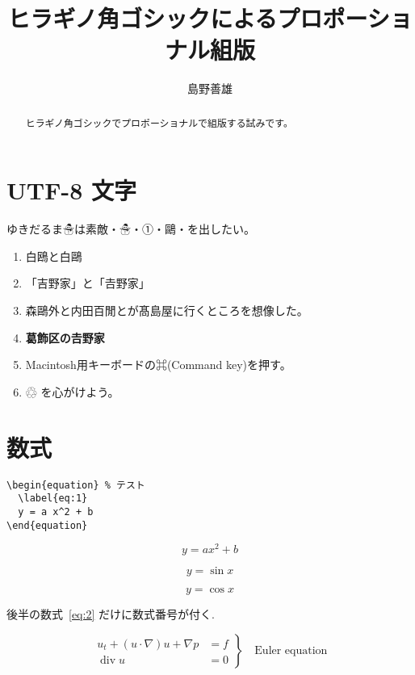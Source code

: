 \documentclass[14pt,a4paper]{ltjsarticle}
\title{ヒラギノ角ゴシックによるプロポーショナル組版}
\author{島野善雄}
\begin{document}
\maketitle
\tableofcontents

\begin{abstract}
  ヒラギノ角ゴシックでプロポーショナルで組版する試みです。
\end{abstract}

\section{UTF-8 文字}
ゆきだるま☃は素敵・☃・①・鷗・を出したい。

\begin{enumerate}
\item 白鴎と白鷗
\item「吉野家」と「𠮷野家」
\item 森鷗外と内田百閒とが髙島屋に行くところを想像した。
\item \textbf{葛飾区の𠮷野家}
\item Macintosh用キーボードの⌘(Command key)を押す。
\item ♲ を心がけよう。
\end{enumerate}

\section{数式}

\begin{verbatim}
\begin{equation} % テスト
  \label{eq:1}
  y = a x^2 + b
\end{equation}
\end{verbatim}

\begin{equation}
  \label{eq:1}
  y = a x^2 + b
\end{equation}

\begin{equation}
    y = \sin x  \label{eq:1}
\end{equation}

\begin{equation}
    y = \cos x  \label{eq:2}
\end{equation}

後半の数式~\eqref{eq:2} だけに数式番号が付く.

\begin{equation}
    \left.
    \begin{aligned}
        u_t + (u \cdot \nabla)u + \nabla p &= f \\
        \operatorname{div} u               &= 0
    \end{aligned}
    \right\} 
    \quad \text{Euler equation}
\end{equation}
\end{document}
